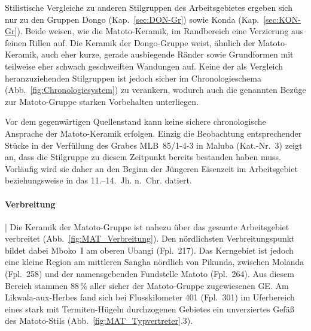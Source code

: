 Stilistische Vergleiche zu anderen Stilgruppen des Arbeitsgebietes ergeben sich nur zu den Gruppen Dongo (Kap.~\ref{sec:DON-Gr}) sowie Konda (Kap.~\ref{sec:KON-Gr}). Beide weisen, wie die Matoto-Keramik, im Randbereich eine Verzierung aus feinen Rillen auf. Die Keramik der Dongo-Gruppe weist, ähnlich der Matoto-Keramik, auch eher kurze, gerade ausbiegende Ränder sowie Grundformen mit teilweise eher schwach geschweiften Wandungen auf. Keine der als Vergleich heranzuziehenden Stilgruppen ist jedoch sicher im Chronologieschema (Abb.~\ref{fig:Chronologiesystem}) zu verankern, wodurch auch die genannten Bezüge zur Matoto-Gruppe starken Vorbehalten unterliegen.

Vor dem gegenwärtigen Quellenstand kann keine sichere chronologische Ansprache der Matoto-Keramik erfolgen. Einzig die Beobachtung entsprechender Stücke in der Verfüllung des Grabes MLB~85/1-4-3 in Maluba (Kat.-Nr.~3) zeigt an, dass die Stilgruppe zu diesem Zeitpunkt bereits bestanden haben muss. Vorläufig wird sie daher an den Beginn der Jüngeren Eisenzeit im Arbeitsgebiet beziehungsweise in das 11.--14.~Jh. n.~Chr. datiert.

\paragraph{Verbreitung}\hspace{-.5em}|\hspace{.5em}%
Die Keramik der Matoto-Gruppe ist nahezu über das gesamte Arbeitsgebiet verbreitet (Abb.~\ref{fig:MAT_Verbreitung}). Den nördlichsten Verbreitungspunkt bildet dabei Mboko~I am oberen \mbox{Ubangi} (Fpl.~217). Das Kerngebiet ist jedoch eine kleine Region am mittleren \mbox{Sangha} nördlich von Pikunda, zwischen Molanda (Fpl.~258) und der namensgebenden Fundstelle Matoto (Fpl.~264). Aus diesem Bereich stammen 88\,\% aller sicher der Matoto-Gruppe zugewiesenen GE. Am \mbox{Likwala}-\mbox{aux}-\mbox{Herbes} fand sich bei Flusskilometer 401 (Fpl.~301) im Uferbereich eines stark mit Termiten-Hügeln durchzogenen Gebietes ein unverziertes Gefäß des Matoto-Stils (Abb.~\ref{fig:MAT_Typvertreter}.3).